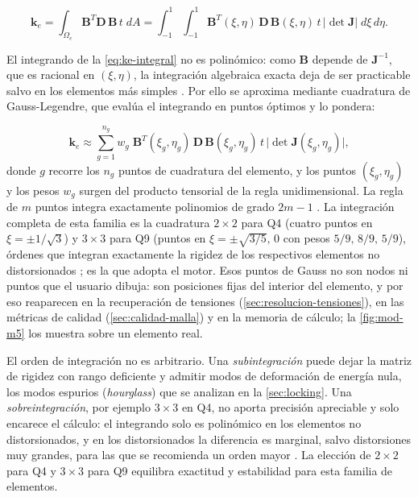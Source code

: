 \begin{equation}
\bm{k}_e = \int_{\Omega_e} \bm{B}^T \bm{D}\, \bm{B}\, t \; dA
= \int_{-1}^{1}\!\!\int_{-1}^{1} \bm{B}^T(\xi,\eta)\,\bm{D}\,\bm{B}(\xi,\eta)\, t\, \lvert\det\bm{J}\rvert\; d\xi\, d\eta.
\label{eq:ke-integral}
\end{equation}

El integrando de la \autoref{eq:ke-integral} no es polinómico: como $\bm{B}$ depende de $\bm{J}^{-1}$, que es racional en $(\xi,\eta)$, la integración algebraica exacta deja de ser practicable salvo en los elementos más simples \autocites[p.~147]{zienkiewicz2013fem}[p.~191]{hughes2000fem}. Por ello se aproxima mediante cuadratura de Gauss-Legendre, que evalúa el integrando en puntos óptimos y lo pondera:

\begin{equation}
\bm{k}_e \approx \sum_{g=1}^{n_g} w_g\; \bm{B}^T(\xi_g,\eta_g)\,\bm{D}\,\bm{B}(\xi_g,\eta_g)\, t\, \lvert\det\bm{J}(\xi_g,\eta_g)\rvert,
\label{eq:ke-gauss}
\end{equation}
donde $g$ recorre los $n_g$ puntos de cuadratura del elemento, y los puntos $(\xi_g,\eta_g)$ y los pesos $w_g$ surgen del producto tensorial de la regla unidimensional. La regla de $m$ puntos integra exactamente polinomios de grado $2m-1$ \autocites[pp.~141-142]{hughes2000fem}[p.~161]{zienkiewicz2013fem}. La integración completa de esta familia es la cuadratura $2\times2$ para Q4 (cuatro puntos en $\xi = \pm 1/\sqrt{3}$) y $3\times3$ para Q9 (puntos en $\xi = \pm\sqrt{3/5},\,0$ con pesos $5/9,\,8/9,\,5/9$), órdenes que integran exactamente la rigidez de los respectivos elementos no distorsionados \autocites[pp.~221-222]{hughes2000fem}[p.~470]{bathe2014fem}; es la que adopta el motor. Esos puntos de Gauss no son nodos ni puntos que el usuario dibuja: son posiciones fijas del interior del elemento, y por eso reaparecen en la recuperación de tensiones (\autoref{sec:resolucion-tensiones}), en las métricas de calidad (\autoref{sec:calidad-malla}) y en la memoria de cálculo; la \autoref{fig:mod-m5} los muestra sobre un elemento real.

El orden de integración no es arbitrario. Una \emph{subintegración} puede dejar la matriz de rigidez con rango deficiente y admitir modos de deformación de energía nula, los modos espurios (\emph{hourglass}) que se analizan en la \autoref{sec:locking}. Una \emph{sobreintegración}, por ejemplo $3\times3$ en Q4, no aporta precisión apreciable y solo encarece el cálculo: el integrando solo es polinómico en los elementos no distorsionados, y en los distorsionados la diferencia es marginal, salvo distorsiones muy grandes, para las que se recomienda un orden mayor \autocite[p.~476]{bathe2014fem}. La elección de $2\times2$ para Q4 y $3\times3$ para Q9 equilibra exactitud y estabilidad para esta familia de elementos.

